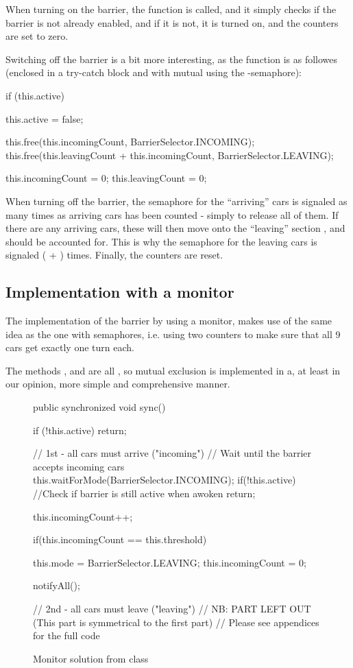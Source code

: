 When turning on the barrier, the function  is called, and
it simply checks if the barrier is not already enabled, and if it is
not, it is turned on, and the counters are set to zero.

Switching off the barrier is a bit more interesting, as the function
 is as followes (enclosed in a try-catch block and with
mutual using the -semaphore):

\begin{java}
if (this.active) {
	this.active = false;

	this.free(this.incomingCount, BarrierSelector.INCOMING);
	this.free(this.leavingCount + this.incomingCount, BarrierSelector.LEAVING);

	this.incomingCount = 0;
	this.leavingCount = 0;
}
\end{java}

When turning off the barrier, the semaphore for the ``arriving'' cars
is signaled as many times as arriving cars has been counted - simply
to release all of them. If there are any arriving cars, these will
then move onto the ``leaving'' section , and should be
accounted for. This is why the semaphore for the leaving cars is
signaled ( + ) times. Finally,
the counters are reset.

\subsection{Implementation with a monitor}
\label{sub:bar-moni}
The implementation of the barrier by using a monitor, makes use of the
same idea as the one with semaphores, i.e. using two counters to make
sure that all 9 cars get exactly one turn each.

The methods ,  and  are all
, so mutual exclusion is implemented in a, at least
in our opinion, more simple and comprehensive manner.

\begin{figure}[H]
\label{lst:bar-moni}
\begin{java}
public synchronized void sync() {
	if (!this.active)
		return;

	// 1st - all cars must arrive ("incoming")
	// Wait until the barrier accepts incoming cars
	this.waitForMode(BarrierSelector.INCOMING);
	if(!this.active) //Check if barrier is still active when awoken
		return;

	this.incomingCount++;

	if(this.incomingCount == this.threshold) {
		this.mode = BarrierSelector.LEAVING;
		this.incomingCount = 0;

		notifyAll();
	}
	// 2nd - all cars must leave ("leaving")
	// NB: PART LEFT OUT (This part is symmetrical to the first part)
	// Please see appendices for the full code
}
\end{java}
\caption{Monitor solution from  class}
\end{figure}

